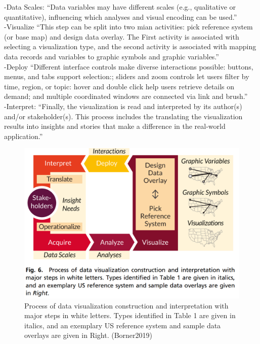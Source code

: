 -{\color{orange}Data Scales: “Data variables may have different scales (e.g., qualitative or quantitative), influencing which analyses and visual encoding can be used.”\cite{Borner2019}}\\
-{\color{orange}Visualize “This step can be split into two mian activities: pick reference system (or base map) and design data overlay. The First activity is associated with selecting a visualization type, and the second activity is associated with mapping data records and variables to graphic symbols and graphic variables.”\cite{Borner2019}}\\
-{\color{orange}Deploy “Different interface controls make diverse interactions possible: buttons, menus, and tabs support selection:; sliders and zoom controls let users filter by time, region, or topic: hover and double click help users retrieve details on demand; and multiple coordinated windows are connected via link and brush.”\cite{Borner2019}}\\
-{\color{orange}Interpret: “Finally, the visualization is read and interpreted by its author(s) and/or stakeholder(s). This process includes the translating the visualization results into insights and stories that make a difference in the real-world application.”\cite{Borner2019}}\\

\begin{figure}[H]
	\centering
	\includegraphics[width=.9\linewidth]{images/borner2019_figure6.png}
	\caption{Process of data visualization construction and interpretation with major steps in white letters. Types identified in Table 1 are given in italics, and an exemplary US reference system and sample data overlays are given in Right. (Borner2019)}
	\label{fig:borner2019_fig6}
\end{figure}


